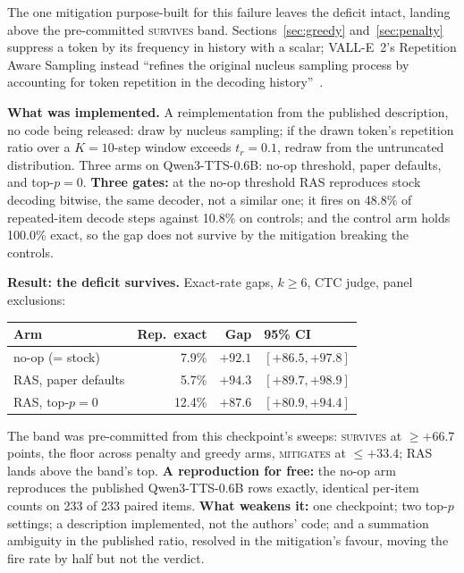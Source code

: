 The one mitigation purpose-built for this failure leaves the deficit intact, landing above the
pre-committed \textsc{survives} band. Sections~\ref{sec:greedy} and~\ref{sec:penalty} suppress a
token by its frequency in history with a scalar; VALL-E~2's Repetition Aware Sampling instead
``refines the original nucleus sampling process by accounting for token repetition in the
decoding history''~\cite{chen2024valle2}.

\noindent\textbf{What was implemented.} A reimplementation from the published description, no
code being released: draw by nucleus sampling; if the drawn token's repetition ratio over a
$K{=}10$-step window exceeds $t_r{=}0.1$, redraw from the untruncated distribution. Three arms
on Qwen3-TTS-0.6B: no-op threshold, paper defaults, and top-$p{=}0$. \textbf{Three gates:} at
the no-op threshold RAS reproduces stock decoding bitwise, the same decoder, not a similar one;
it fires on 48.8\% of repeated-item decode steps against 10.8\% on controls; and the control
arm holds 100.0\% exact, so the gap does not survive by the mitigation breaking the controls.

\noindent\textbf{Result: the deficit survives.} Exact-rate gaps, $k\ge6$, CTC judge, panel
exclusions:

\begin{center}
\begin{tabular}{@{}lrrl@{}}
\toprule
Arm & Rep.\ exact & Gap & 95\% CI \\
\midrule
no-op (= stock)          & 7.9\%  & $+92.1$ & $[+86.5, +97.8]$ \\
RAS, paper defaults      & 5.7\%  & $+94.3$ & $[+89.7, +98.9]$ \\
RAS, $\text{top-}p{=}0$  & 12.4\% & $+87.6$ & $[+80.9, +94.4]$ \\
\bottomrule
\end{tabular}
\end{center}

\noindent The band was pre-committed from this checkpoint's sweeps: \textsc{survives} at
$\ge +66.7$ points, the floor across penalty and greedy arms, \textsc{mitigates} at
$\le +33.4$; RAS lands above the band's top. \textbf{A reproduction for free:} the no-op arm
reproduces the published Qwen3-TTS-0.6B rows exactly, identical per-item counts on 233 of 233
paired items. \textbf{What weakens it:} one checkpoint; two top-$p$ settings; a description
implemented, not the authors' code; and a summation ambiguity in the published ratio, resolved
in the mitigation's favour, moving the fire rate by half but not the verdict.
